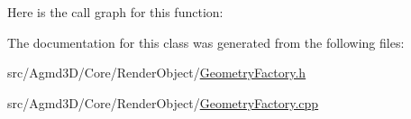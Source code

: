Here is the call graph for this function\+:




The documentation for this class was generated from the following files\+:\begin{DoxyCompactItemize}
\item 
src/\+Agmd3\+D/\+Core/\+Render\+Object/\hyperlink{_geometry_factory_8h}{Geometry\+Factory.\+h}\item 
src/\+Agmd3\+D/\+Core/\+Render\+Object/\hyperlink{_geometry_factory_8cpp}{Geometry\+Factory.\+cpp}\end{DoxyCompactItemize}
